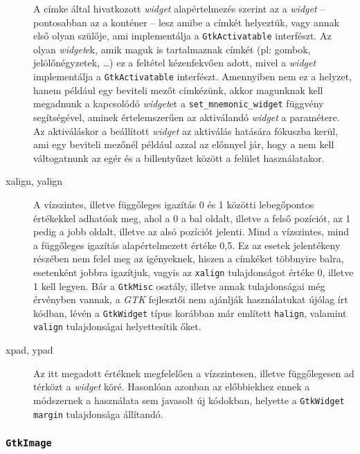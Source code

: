 \begin{description}
  A címke által hivatkozott \textit{widget} alapértelmezés szerint az a \textit{widget} -- pontosabban az a konténer -- lesz amibe a címkét helyeztük, vagy annak első olyan szülője, ami implementálja a \texttt{GtkActivatable} interfészt. Az olyan \textit{widget}ek, amik maguk is tartalmaznak címkét (pl: gombok, jelölőnégyzetek, \dots ) ez a feltétel kézenfekvően adott, mivel a \textit{widget} implementálja a \texttt{GtkActivatable} interfészt. Amennyiben nem ez a helyzet, hanem például egy beviteli mezőt címkézünk, akkor magunknak kell megadnunk a kapcsolódó \textit{widget}et a \texttt{set\_mnemonic\_widget} függvény segítségével, aminek értelemszerűen az aktiválandó \textit{widget} a paramétere. Az aktiváláskor a beállított \textit{widget} az aktiválás hatására fókuszba kerül, ami egy beviteli mezőnél például azzal az előnnyel jár, hogy a nem kell váltogatnunk az egér és a billentyűzet között a felület használatakor.
  \item[xalign, yalign] A vízszintes, illetve függőleges igazítás 0 és 1 közötti lebegőpontos értékekkel adhatóak meg, ahol a 0 a bal oldalt, illetve a felső pozíciót, az 1 pedig a jobb oldalt, illetve az alsó pozíciót jelenti. Mind a vízszintes, mind a függőleges igazítás alapértelmezett értéke 0,5. Ez az esetek jelentékeny részében nem felel meg az igényeknek, hiszen a címkéket többnyire balra, esetenként jobbra igazítjuk, vagyis az \texttt{xalign} tulajdonságot értéke 0, illetve 1 kell legyen. Bár a \texttt{GtkMisc} osztály, illetve annak tulajdonságai még érvényben vannak, a \textit{GTK} fejlesztői nem ajánlják használatukat újólag írt kódban, lévén a \texttt{GtkWidget} típus korábban már említett \texttt{halign}, valamint \texttt{valign} tulajdonságai helyettesítik őket.
  \item[xpad, ypad] Az itt megadott értéknek megfelelően a vízszintesen, illetve függőlegesen ad térközt a \textit{widget} köré. Hasonlóan azonban az előbbiekhez ennek a módszernek a használata sem javasolt új kódokban, helyette a \texttt{GtkWidget} \texttt{margin} tulajdonsága állítandó.
\end{description}

\subsubsection{\texttt{GtkImage}}

